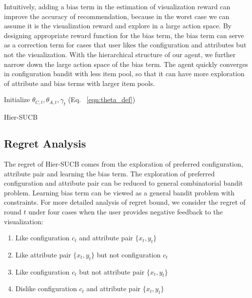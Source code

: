 Intuitively, adding a bias term in the estimation of visualization reward can improve the accuracy of recommendation, because in the worst case we can assume it is the visualization reward and explore in a large action space. By designing appropriate reward function for the bias term, the bias term can serve as a correction term for cases that user likes the configuration and attributes but not the visualization. With the hierarchical structure of our agent, we further narrow down the large action space of the bias term. The agent quickly converges in configuration bandit with less item pool, so that it can have more exploration of attribute and bias terms with larger item pools.

\begin{algorithm}
    \SetAlgoLined
        Initialize $\theta_{C,t},\theta_{A,t}, \gamma_t$ (Eq. ~\ref{eqn:theta_def})\;
\caption{Hier-SUCB}

\end{algorithm}

\subsection{Regret Analysis}
The regret of Hier-SUCB comes from the exploration of preferred configuration, attribute pair and learning the bias term. The exploration of preferred configuration and attribute pair can be reduced to general combinatorial bandit problem. Learning bias term can be viewed as a general bandit problem with constraints. For more detailed analysis of regret bound, we consider the regret of round $t$ under four cases when the user provides negative feedback to the visualization:
\begin{enumerate}
    \item Like configuration $c_t$ and attribute pair $\lbrace x_t,y_t \rbrace$ 
    \item Like attribute pair $\lbrace x_t,y_t \rbrace$ but not configuration $c_t$
    \item Like configuration $c_t$ but not attribute pair $\lbrace x_t,y_t \rbrace$
    \item Dislike configuration $c_t$ and attribute pair $\lbrace x_t,y_t \rbrace$
\end{enumerate}

